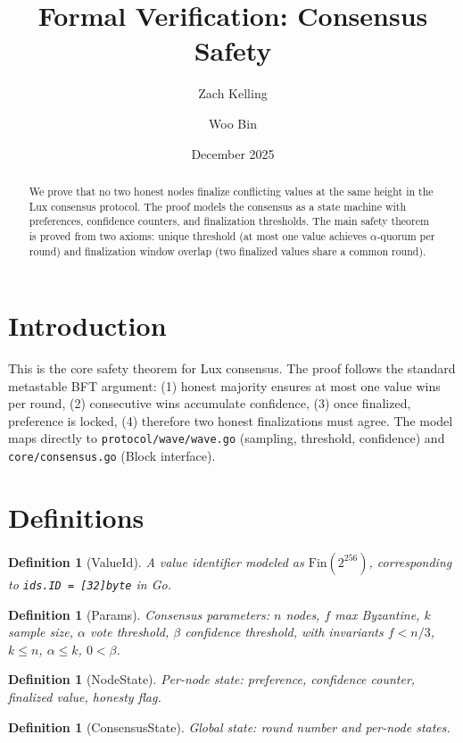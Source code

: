 \documentclass[11pt]{article}
\title{Formal Verification: Consensus Safety}
\author{Zach Kelling \and Woo Bin}
\date{December 2025}
\newtheorem{definition}[theorem]{Definition}
\begin{document}
\maketitle

\begin{abstract}
We prove that no two honest nodes finalize conflicting values at the same height in the Lux consensus protocol. The proof models the consensus as a state machine with preferences, confidence counters, and finalization thresholds. The main safety theorem is proved from two axioms: unique threshold (at most one value achieves $\alpha$-quorum per round) and finalization window overlap (two finalized values share a common round).
\end{abstract}

\section{Introduction}
This is the core safety theorem for Lux consensus. The proof follows the standard metastable BFT argument: (1) honest majority ensures at most one value wins per round, (2) consecutive wins accumulate confidence, (3) once finalized, preference is locked, (4) therefore two honest finalizations must agree. The model maps directly to \texttt{protocol/wave/wave.go} (sampling, threshold, confidence) and \texttt{core/consensus.go} (Block interface).

\section{Definitions}
\begin{definition}[ValueId]
A value identifier modeled as $\text{Fin}(2^{256})$, corresponding to \texttt{ids.ID = [32]byte} in Go.
\end{definition}

\begin{definition}[Params]
Consensus parameters: $n$ nodes, $f$ max Byzantine, $k$ sample size, $\alpha$ vote threshold, $\beta$ confidence threshold, with invariants $f < n/3$, $k \leq n$, $\alpha \leq k$, $0 < \beta$.
\end{definition}

\begin{definition}[NodeState]
Per-node state: preference, confidence counter, finalized value, honesty flag.
\end{definition}

\begin{definition}[ConsensusState]
Global state: round number and per-node states.
\end{definition}
\end{document}
